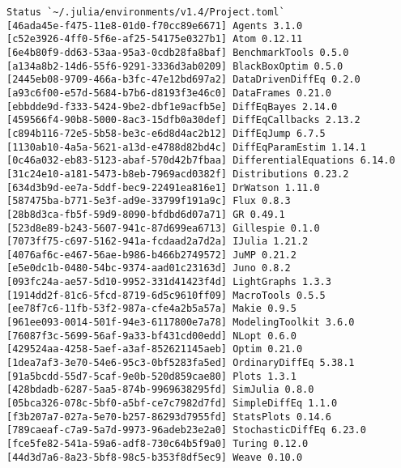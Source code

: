 \documentclass[12pt,a4paper]{article}
\begin{document}
\begin{verbatim}
Status `~/.julia/environments/v1.4/Project.toml`
[46ada45e-f475-11e8-01d0-f70cc89e6671] Agents 3.1.0
[c52e3926-4ff0-5f6e-af25-54175e0327b1] Atom 0.12.11
[6e4b80f9-dd63-53aa-95a3-0cdb28fa8baf] BenchmarkTools 0.5.0
[a134a8b2-14d6-55f6-9291-3336d3ab0209] BlackBoxOptim 0.5.0
[2445eb08-9709-466a-b3fc-47e12bd697a2] DataDrivenDiffEq 0.2.0
[a93c6f00-e57d-5684-b7b6-d8193f3e46c0] DataFrames 0.21.0
[ebbdde9d-f333-5424-9be2-dbf1e9acfb5e] DiffEqBayes 2.14.0
[459566f4-90b8-5000-8ac3-15dfb0a30def] DiffEqCallbacks 2.13.2
[c894b116-72e5-5b58-be3c-e6d8d4ac2b12] DiffEqJump 6.7.5
[1130ab10-4a5a-5621-a13d-e4788d82bd4c] DiffEqParamEstim 1.14.1
[0c46a032-eb83-5123-abaf-570d42b7fbaa] DifferentialEquations 6.14.0
[31c24e10-a181-5473-b8eb-7969acd0382f] Distributions 0.23.2
[634d3b9d-ee7a-5ddf-bec9-22491ea816e1] DrWatson 1.11.0
[587475ba-b771-5e3f-ad9e-33799f191a9c] Flux 0.8.3
[28b8d3ca-fb5f-59d9-8090-bfdbd6d07a71] GR 0.49.1
[523d8e89-b243-5607-941c-87d699ea6713] Gillespie 0.1.0
[7073ff75-c697-5162-941a-fcdaad2a7d2a] IJulia 1.21.2
[4076af6c-e467-56ae-b986-b466b2749572] JuMP 0.21.2
[e5e0dc1b-0480-54bc-9374-aad01c23163d] Juno 0.8.2
[093fc24a-ae57-5d10-9952-331d41423f4d] LightGraphs 1.3.3
[1914dd2f-81c6-5fcd-8719-6d5c9610ff09] MacroTools 0.5.5
[ee78f7c6-11fb-53f2-987a-cfe4a2b5a57a] Makie 0.9.5
[961ee093-0014-501f-94e3-6117800e7a78] ModelingToolkit 3.6.0
[76087f3c-5699-56af-9a33-bf431cd00edd] NLopt 0.6.0
[429524aa-4258-5aef-a3af-852621145aeb] Optim 0.21.0
[1dea7af3-3e70-54e6-95c3-0bf5283fa5ed] OrdinaryDiffEq 5.38.1
[91a5bcdd-55d7-5caf-9e0b-520d859cae80] Plots 1.3.1
[428bdadb-6287-5aa5-874b-9969638295fd] SimJulia 0.8.0
[05bca326-078c-5bf0-a5bf-ce7c7982d7fd] SimpleDiffEq 1.1.0
[f3b207a7-027a-5e70-b257-86293d7955fd] StatsPlots 0.14.6
[789caeaf-c7a9-5a7d-9973-96adeb23e2a0] StochasticDiffEq 6.23.0
[fce5fe82-541a-59a6-adf8-730c64b5f9a0] Turing 0.12.0
[44d3d7a6-8a23-5bf8-98c5-b353f8df5ec9] Weave 0.10.0
\end{verbatim}
\end{document}
